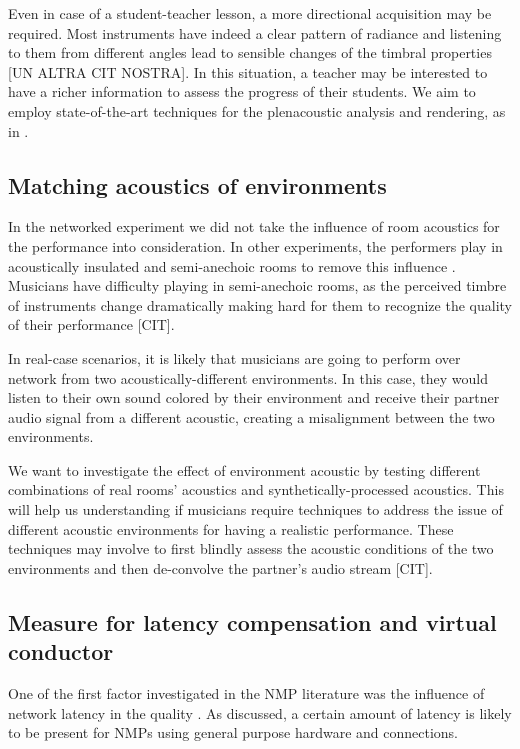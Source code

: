 Even in case of a student-teacher lesson, a more directional acquisition may be required. Most instruments have indeed a clear pattern of radiance and listening to them from different angles lead to sensible changes of the timbral properties [UN ALTRA CIT NOSTRA]. In this situation, a teacher may be interested to have a richer information to assess the progress of their students. We aim to employ state-of-the-art techniques for the plenacoustic analysis and rendering, as in \cite{Canclini2015}.

\subsection{Matching acoustics of environments}
In the networked experiment we did not take the influence of room acoustics for the performance into consideration. In other experiments, the performers play in acoustically insulated and semi-anechoic rooms to remove this influence \cite{RottondiFeature}. Musicians have difficulty playing in semi-anechoic rooms, as the perceived timbre of instruments change dramatically making hard for them to recognize the quality of their performance [CIT].

In real-case scenarios, it is likely that musicians are going to perform over network from two acoustically-different environments. In this case, they would listen to their own sound colored by their environment and receive their partner audio signal from a different acoustic, creating a misalignment between the two environments.

We want to investigate the effect of environment acoustic by testing different combinations of real rooms' acoustics and synthetically-processed acoustics. This will help us understanding if musicians require techniques to address the issue of different acoustic environments for having a realistic performance. These techniques may involve to first blindly assess the acoustic conditions of the two environments and then de-convolve the partner's audio stream [CIT].



\subsection{Measure for latency compensation and virtual conductor}
One of the first factor investigated in the NMP literature was the influence of network latency in the quality \cite{RottondiOverview,drioli2013networked,CIM2018}. As discussed, a certain amount of latency is likely to be present for NMPs using general purpose hardware and connections.

